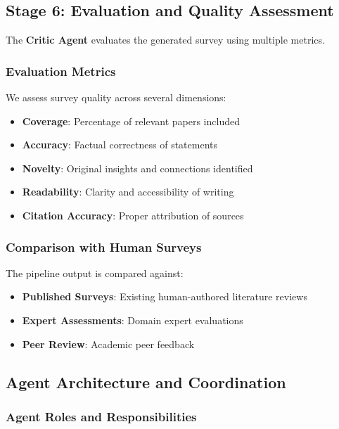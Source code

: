 \subsection{Stage 6: Evaluation and Quality Assessment}

The \textbf{Critic Agent} evaluates the generated survey using multiple metrics.

\subsubsection{Evaluation Metrics}

We assess survey quality across several dimensions:
\begin{itemize}
    \item \textbf{Coverage}: Percentage of relevant papers included
    \item \textbf{Accuracy}: Factual correctness of statements
    \item \textbf{Novelty}: Original insights and connections identified
    \item \textbf{Readability}: Clarity and accessibility of writing
    \item \textbf{Citation Accuracy}: Proper attribution of sources
\end{itemize}

\subsubsection{Comparison with Human Surveys}

The pipeline output is compared against:
\begin{itemize}
    \item \textbf{Published Surveys}: Existing human-authored literature reviews
    \item \textbf{Expert Assessments}: Domain expert evaluations
    \item \textbf{Peer Review}: Academic peer feedback
\end{itemize}

\subsection{Agent Architecture and Coordination}

\subsubsection{Agent Roles and Responsibilities}

